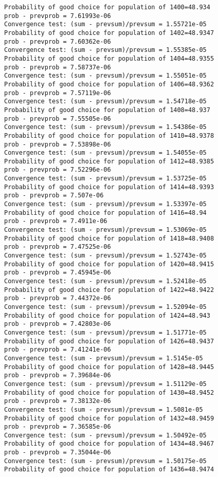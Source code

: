 \documentclass[11pt,onecolumn]{article}
\begin{document}
\begin{verbatim}
Probability of good choice for population of 1400=48.934
prob - prevprob = 7.61993e-06
Convergence test: (sum - prevsum)/prevsum = 1.55721e-05
Probability of good choice for population of 1402=48.9347
prob - prevprob = 7.60362e-06
Convergence test: (sum - prevsum)/prevsum = 1.55385e-05
Probability of good choice for population of 1404=48.9355
prob - prevprob = 7.58737e-06
Convergence test: (sum - prevsum)/prevsum = 1.55051e-05
Probability of good choice for population of 1406=48.9362
prob - prevprob = 7.57119e-06
Convergence test: (sum - prevsum)/prevsum = 1.54718e-05
Probability of good choice for population of 1408=48.937
prob - prevprob = 7.55505e-06
Convergence test: (sum - prevsum)/prevsum = 1.54386e-05
Probability of good choice for population of 1410=48.9378
prob - prevprob = 7.53898e-06
Convergence test: (sum - prevsum)/prevsum = 1.54055e-05
Probability of good choice for population of 1412=48.9385
prob - prevprob = 7.52296e-06
Convergence test: (sum - prevsum)/prevsum = 1.53725e-05
Probability of good choice for population of 1414=48.9393
prob - prevprob = 7.507e-06
Convergence test: (sum - prevsum)/prevsum = 1.53397e-05
Probability of good choice for population of 1416=48.94
prob - prevprob = 7.4911e-06
Convergence test: (sum - prevsum)/prevsum = 1.53069e-05
Probability of good choice for population of 1418=48.9408
prob - prevprob = 7.47525e-06
Convergence test: (sum - prevsum)/prevsum = 1.52743e-05
Probability of good choice for population of 1420=48.9415
prob - prevprob = 7.45945e-06
Convergence test: (sum - prevsum)/prevsum = 1.52418e-05
Probability of good choice for population of 1422=48.9422
prob - prevprob = 7.44372e-06
Convergence test: (sum - prevsum)/prevsum = 1.52094e-05
Probability of good choice for population of 1424=48.943
prob - prevprob = 7.42803e-06
Convergence test: (sum - prevsum)/prevsum = 1.51771e-05
Probability of good choice for population of 1426=48.9437
prob - prevprob = 7.41241e-06
Convergence test: (sum - prevsum)/prevsum = 1.5145e-05
Probability of good choice for population of 1428=48.9445
prob - prevprob = 7.39684e-06
Convergence test: (sum - prevsum)/prevsum = 1.51129e-05
Probability of good choice for population of 1430=48.9452
prob - prevprob = 7.38132e-06
Convergence test: (sum - prevsum)/prevsum = 1.5081e-05
Probability of good choice for population of 1432=48.9459
prob - prevprob = 7.36585e-06
Convergence test: (sum - prevsum)/prevsum = 1.50492e-05
Probability of good choice for population of 1434=48.9467
prob - prevprob = 7.35044e-06
Convergence test: (sum - prevsum)/prevsum = 1.50175e-05
Probability of good choice for population of 1436=48.9474

\end{verbatim}
\end{document}
